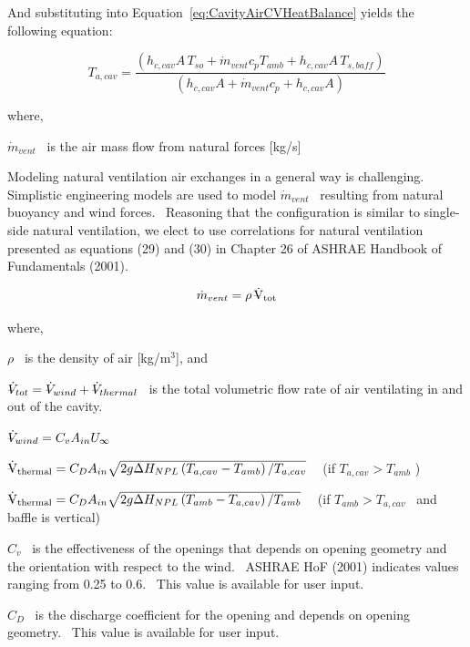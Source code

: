 And substituting into Equation~\ref{eq:CavityAirCVHeatBalance} yields the following equation:

\begin{equation}
{T_{a,cav}} = \frac{{\left( {{h_{c,cav}}A\,{T_{so}} + {{\dot m}_{vent}}{c_p}{T_{amb}} + {h_{c,cav}}A\,{T_{s,baff}}} \right)}}{{\left( {{h_{c,cav}}A + {{\dot m}_{vent}}{c_p} + {h_{c,cav}}A} \right)}}
\end{equation}

where,

\({\dot m_{vent}}\) ~is the air mass flow from natural forces {[}kg/s{]}

Modeling natural ventilation air exchanges in a general way is challenging.~ Simplistic engineering models are used to model \({\dot m_{vent}}\) ~resulting from natural buoyancy and wind forces.~ Reasoning that the configuration is similar to single-side natural ventilation, we elect to use correlations for natural ventilation presented as equations (29) and (30) in Chapter 26 of ASHRAE Handbook of Fundamentals (2001).

\begin{equation}
{\dot m_{vent}} = \rho \,{{\rm{\rlap{--} \dot V}}_{{\rm{tot}}}}
\end{equation}

where,

\(\rho\) ~is the density of air {[}kg/m\(^{3}\){]}, and

\(\rlap{--} \dot{V}_{tot} = \rlap{--} \dot{V}_{wind} + \rlap{--} \dot{V}_{thermal}\) ~is the total volumetric flow rate of air ventilating in and out of the cavity.

\(\rlap{--} \dot{V}_{wind} = C_{v}A_{in}U_{\infty}\)

\({{\rm{\rlap{--} \dot V}}_{{\rm{thermal}}}} = {C_D}{A_{in}}\sqrt {2g\Delta {H_{NPL}}\left( {{T_{a,cav}} - {T_{amb}}} \right)/{T_{a,cav}}}\) ~ (if \(T_{a,cav} > T_{amb}\) )

\({{\rm{\rlap{--} \dot V}}_{{\rm{thermal}}}} = {C_D}{A_{in}}\sqrt {2g\Delta {H_{NPL}}\left( {{T_{amb}} - {T_{a,cav}}} \right)/{T_{amb}}}\) ~ (if \(T_{amb} > T_{a,cav}\) ~and baffle is vertical)

\({C_v}\) ~is the effectiveness of the openings that depends on opening geometry and the orientation with respect to the wind.~ ASHRAE HoF (2001) indicates values ranging from 0.25 to 0.6.~ This value is available for user input.

\({C_D}\) ~is the discharge coefficient for the opening and depends on opening geometry.~ This value is available for user input.

